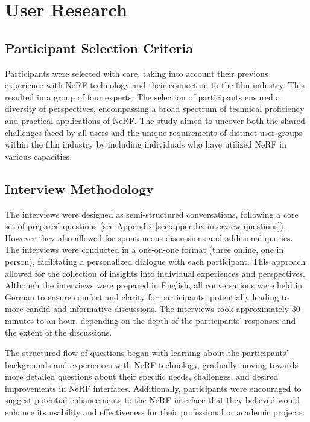 %
\chapter{User Research}
\label{sec:user-research}

\section{Participant Selection Criteria}
\label{sec:user-research:criteria}

Participants were selected with care, taking into account their previous experience with NeRF technology and their connection to the film industry. 
This resulted in a group of four experts. 
The selection of participants ensured a diversity of perspectives, encompassing a broad spectrum of technical proficiency and practical applications of NeRF. 
The study aimed to uncover both the shared challenges faced by all users and the unique requirements of distinct user groups within the film industry by including individuals who have utilized NeRF in various capacities.

\section{Interview Methodology}
\label{sec:user-research:interview}

The interviews were designed as semi-structured conversations, following a core set of prepared questions (see Appendix \ref{sec:appendix:interview-questions}).
However they also allowed for spontaneous discussions and additional queries. 
The interviews were conducted in a one-on-one format (three online, one in person), facilitating a personalized dialogue with each participant. This approach allowed for the collection of insights into individual experiences and perspectives. 
Although the interviews were prepared in English, all conversations were held in German to ensure comfort and clarity for participants, potentially leading to more candid and informative discussions.
The interviews took approximately 30 minutes to an hour, depending on the depth of the participants' responses and the extent of the discussions.

The structured flow of questions began with learning about the participants' backgrounds and experiences with NeRF technology, gradually moving towards more detailed questions about their specific needs, challenges, and desired improvements in NeRF interfaces. 
Additionally, participants were encouraged to suggest potential enhancements to the NeRF interface that they believed would enhance its usability and effectiveness for their professional or academic projects.

